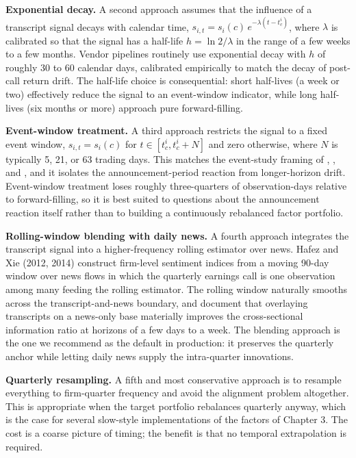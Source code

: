 \textbf{Exponential decay.} A second approach assumes that the influence of a transcript signal decays with calendar time, $s_{i,t} = s_i(c)\, e^{ -\lambda (t - t_c^i)}$, where $\lambda$ is calibrated so that the signal has a half-life $h = \ln 2 / \lambda$ in the range of a few weeks to a few months. Vendor pipelines routinely use exponential decay with $h$ of roughly 30 to 60 calendar days, calibrated empirically to match the decay of post-call return drift. The half-life choice is consequential: short half-lives (a week or two) effectively reduce the signal to an event-window indicator, while long half-lives (six months or more) approach pure forward-filling.

\textbf{Event-window treatment.} A third approach restricts the signal to a fixed event window, $s_{i,t} = s_i(c)$ for $t \in [t_c^i, t_c^i + N]$ and zero otherwise, where $N$ is typically 5, 21, or 63 trading days. This matches the event-study framing of \cite{tetlock2007giving}, \cite{tetlock2008more}, and \cite{bartov2018twitter}, and it isolates the announcement-period reaction from longer-horizon drift. Event-window treatment loses roughly three-quarters of observation-days relative to forward-filling, so it is best suited to questions about the announcement reaction itself rather than to building a continuously rebalanced factor portfolio.

\textbf{Rolling-window blending with daily news.} A fourth approach integrates the transcript signal into a higher-frequency rolling estimator over news. Hafez and Xie (2012, 2014) construct firm-level sentiment indices from a moving 90-day window over news flows in which the quarterly earnings call is one observation among many feeding the rolling estimator. The rolling window naturally smooths across the transcript-and-news boundary, and \cite{hafez2021transcripts} document that overlaying transcripts on a news-only base materially improves the cross-sectional information ratio at horizons of a few days to a week. The blending approach is the one we recommend as the default in production: it preserves the quarterly anchor while letting daily news supply the intra-quarter innovations.

\textbf{Quarterly resampling.} A fifth and most conservative approach is to resample everything to firm-quarter frequency and avoid the alignment problem altogether. This is appropriate when the target portfolio rebalances quarterly anyway, which is the case for several slow-style implementations of the factors of Chapter 3. The cost is a coarse picture of timing; the benefit is that no temporal extrapolation is required.

